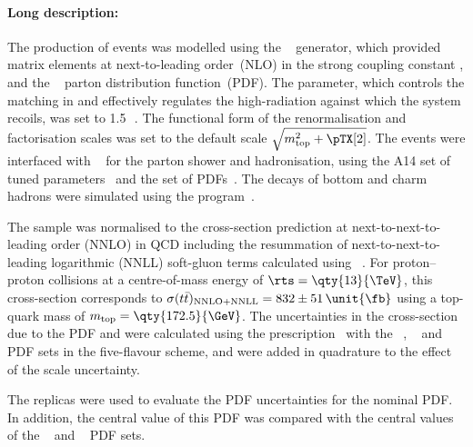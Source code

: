 


\paragraph{Long description:}

The production of \ttbar events was modelled using the
\POWHEGBOX[v2]~\cite{Frixione:2007nw,Nason:2004rx,Frixione:2007vw,Alioli:2010xd}
generator, which provided matrix elements at next-to-leading
order~(NLO) in the strong coupling constant \alphas, and the
\NNPDF[3.0nlo]~\cite{Ball:2014uwa} parton distribution function~(PDF).
The \hdamp parameter, which controls the matching in \POWHEG and
effectively regulates the high-\pT radiation against which the
\ttbar system recoils, was set to 1.5\,\mtop~\cite{ATL-PHYS-PUB-2016-020}.
The functional form of the renormalisation and factorisation scales was
set to the default scale \(\sqrt{\mtop^{2} + \pTX[2]}\).
The events were interfaced with
\PYTHIA[8.230]~\cite{Sjostrand:2014zea} for the parton shower and
hadronisation, using the A14 set of tuned
parameters~\cite{ATL-PHYS-PUB-2014-021} and the \NNPDF[2.3lo]
set of PDFs~\cite{Ball:2012cx}.
The decays of bottom and charm hadrons were simulated using the
\EVTGEN[1.6.0] program~\cite{Lange:2001uf}.

The \ttbar sample was normalised to the cross-section prediction at next-to-next-to-leading order (NNLO)
in QCD including the resummation of next-to-next-to-leading logarithmic (NNLL) soft-gluon terms calculated using
\TOPpp[2.0]~\cite{Beneke:2011mq,Cacciari:2011hy,Baernreuther:2012ws,Czakon:2012zr,Czakon:2012pz,Czakon:2013goa,Czakon:2011xx}.
For proton--proton collisions at a centre-of-mass energy of \(\rts = \qty{13}{\TeV}\), this cross-section corresponds to
\(\sigma(\ttbar)_{\text{NNLO+NNLL}} = 832 \pm 51\,\unit{\fb}\) using a top-quark mass of \(\mtop = \qty{172.5}{\GeV}\).
The uncertainties in the cross-section due to the PDF and \alphas were calculated using the \PDFforLHC[15] prescription~\cite{Butterworth:2015oua}
with the \MSTW[nnlo]~\cite{Martin:2009iq,Martin:2009bu}, \CT[10nnlo]~\cite{Lai:2010vv,Gao:2013xoa}
and \NNPDF[2.3lo]~\cite{Ball:2012cx} PDF sets in the five-flavour scheme, and were added in quadrature to the effect of the scale uncertainty.



The \NNPDF[3.0lo] replicas were used to evaluate the PDF uncertainties for the nominal PDF.
In addition, the central value of this PDF was compared with the central values of the
\CT[14nnlo]~\cite{Dulat:2015mca} and \MMHT[nnlo]~\cite{Harland-Lang:2014zoa} PDF sets.


